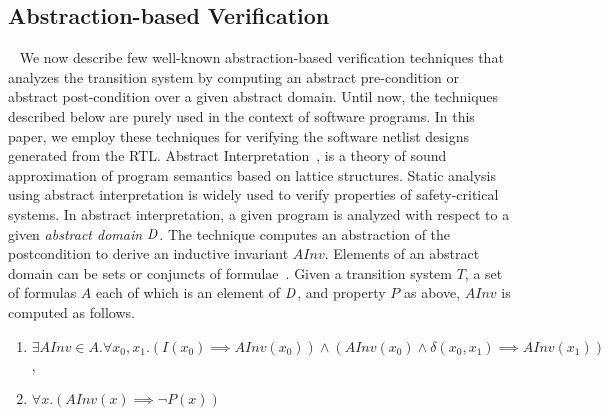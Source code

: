 \subsection{Abstraction-based Verification}~\label{software-verif}
%
We now describe few well-known abstraction-based verification 
techniques that analyzes the transition system by computing an 
abstract pre-condition or abstract post-condition over a given 
abstract domain. Until now, the techniques described below 
are purely used in the context of software programs. In this paper, 
we employ these techniques for verifying the software netlist designs 
generated from the RTL. 
%
Abstract Interpretation~\cite{Cousot92,CC79,DBLP:conf/emsoft/Cousot07},
is a theory of sound approximation of program semantics based on lattice 
structures. Static analysis using abstract interpretation is widely used 
to verify properties of safety-critical systems. 
%
In abstract interpretation, a given program is analyzed 
with respect to a given \emph{abstract domain} $\mathit{D}$.  
The technique computes an abstraction of the postcondition to derive an 
inductive invariant $AInv$.
Elements of an abstract domain can be sets or conjuncts 
of formulae~\cite{DBLP:conf/vmcai/BrainDHGK13}.  
Given a transition system $T$, a set of formulas $A$ each of which is an 
element of $\mathit{D}$, and property $P$ as above, $AInv$ is computed as follows. 
%
\begin{enumerate}
\item  $\exists AInv \in A. \forall x_0, x_1. (I(x_0) \implies AInv(x_0)) 
\wedge (AInv(x_0) \wedge \delta(x_0, x_1) \implies AInv(x_1))$, 
\item $\forall x. (AInv(x) \implies \neg{P(x)})$
\end{enumerate}
%
